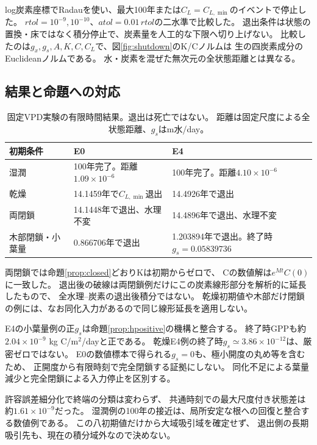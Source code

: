 \documentclass[a4paper,11pt]{ltjsarticle}
\begin{document}
log炭素座標でRadauを使い、最大100年または$C_L=C_{L,\min}$のイベントで停止した。
$rtol=10^{-9},10^{-10}$、$atol=0.01\,rtol$の二水準で比較した。
退出条件は状態の置換・床ではなく積分停止で、炭素量を人工的な下限へ切り上げない。
比較したのは$g_x,g_s,A,K,C,C_L$で、図\ref{fig:shutdown}のK/Cノルムは
生の四炭素成分のEuclideanノルムである。
水・炭素を混ぜた無次元の全状態距離とは異なる。

\subsection{結果と命題への対応}
\begin{table}[htbp]
\centering
\caption{固定VPD実験の有限時間結果。退出は死亡ではない。
距離は固定尺度による全状態距離、$g_s$はm水/day。}\label{tab:fixedresults}
\begin{tabular}{lp{.32\linewidth}p{.32\linewidth}}
\toprule
初期条件&E0&E4\\\midrule
湿潤&100年完了。\newline 距離\mbox{$1.09\times10^{-6}$}&100年完了。\newline 距離\mbox{$4.10\times10^{-6}$}\\
乾燥&14.1459年で$C_{L,\min}$退出&14.4926年で退出\\
両閉鎖&14.1448年で退出、水理不変&14.4896年で退出、水理不変\\
木部閉鎖・小葉量&0.866706年で退出&1.203894年で退出。\newline 終了時\mbox{$g_s=0.05839736$}\\
\bottomrule
\end{tabular}
\end{table}

両閉鎖では命題\ref{prop:closed}どおりKは初期からゼロで、
Cの数値解は$e^{Mt}C(0)$に一致した。
退出後の破線は両閉鎖例だけにこの炭素線形部分を解析的に延長したもので、
全水理--炭素の退出後積分ではない。
乾燥初期値や木部だけ閉鎖の例には、なお同化入力があるので同じ線形延長を適用しない。

E4の小葉量例の正$g_s$は命題\ref{prop:hpositive}の機構と整合する。
終了時GPPも約$2.04\times10^{-9}$ kg C/m$^2$/dayと正である。
乾燥E4例の終了時$g_s\simeq3.86\times10^{-12}$は、厳密ゼロではない。
E0の数値標本で得られる$g_s=0$も、極小開度の丸め等を含むため、
正開度から有限時刻で完全閉鎖する証拠にしない。
同化不足による葉量減少と完全閉鎖による入力停止を区別する。

許容誤差細分化で終端の分類は変わらず、
共通時刻での最大尺度付き状態差は約$1.61\times10^{-9}$だった。
湿潤例の100年の接近は、局所安定な根への回復と整合する数値例である。
この八初期値だけから大域吸引域を確定せず、
退出側の長期吸引先も、現在の積分域外なので決めない。
\end{document}

